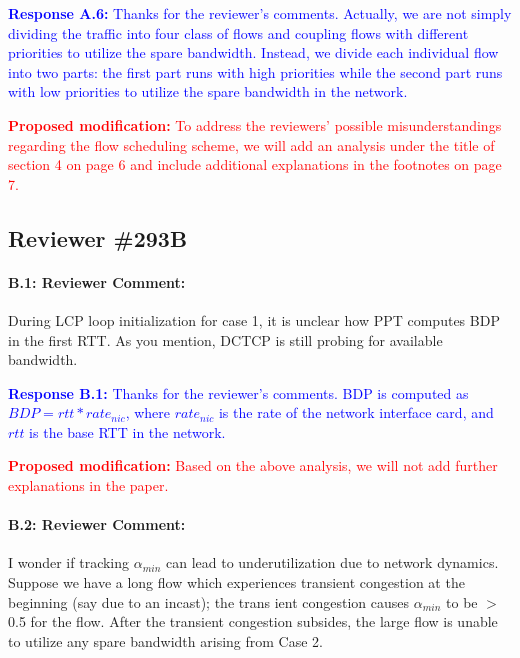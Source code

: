 \documentclass[12pt,one-column]{article}
\begin{document}
\noindent\textcolor{blue}{\textbf{Response A.6:} Thanks for the reviewer's comments. Actually, we are not simply dividing the traffic into four class of flows and coupling flows with different priorities to utilize the spare bandwidth. Instead, we divide each individual flow into two parts: the first part runs with high priorities while the second part runs with low priorities to utilize the spare bandwidth in the network.}

\noindent\textcolor{red}{\textbf{Proposed modification: }
To address the reviewers' possible misunderstandings regarding the flow scheduling scheme, we will add an analysis under the title of section 4 on page 6 and include additional explanations in the footnotes on page 7.
}

\subsection{Reviewer \#293B}
{\it \paragraph{B.1: Reviewer Comment:} During LCP loop initialization for case 1, it is unclear how PPT computes BDP in the first RTT. As you mention, DCTCP is still probing for available bandwidth.}

\noindent\textcolor{blue}{\textbf{Response B.1:}
Thanks for the reviewer's comments. 
BDP is computed as $BDP = rtt*rate_{nic}$, where $rate_{nic}$ is the rate of the network interface card, and $rtt$ is the base RTT in the network.
}

\noindent\textcolor{red}{\textbf{Proposed modification: }
Based on the above analysis, we will not add further explanations in the paper.
}

{\it \paragraph{B.2: Reviewer Comment:} I wonder if tracking $\alpha_{min}$ can lead to underutilization due to network dynamics. Suppose we have a long flow which experiences transient congestion at the beginning (say due to an incast); the trans ient congestion causes $\alpha_{min}$ to be $>$ 0.5 for the flow. After the transient congestion subsides, the large flow is unable to utilize any spare bandwidth arising from Case 2.}
\end{document}
